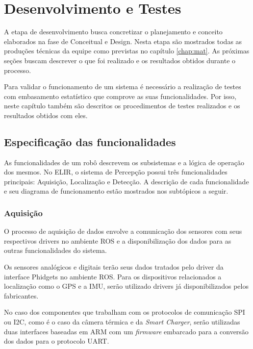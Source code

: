 \chapter{Desenvolvimento e Testes}
\label{chap:result}

A etapa de desenvolvimento busca concretizar o planejamento e conceito elaborados na fase de Conceitual e Design. Nesta etapa são mostrados todas as produções técnicas da equipe como  previstas no capítulo \ref{chap:mat}. As próximas seções buscam descrever o que foi realizado e os resultados obtidos durante o processo.

Para validar o funcionamento de um sistema é necessário a realização de testes com embasamento estatístico que comprove as suas funcionalidades. Por isso, neste capítulo também são descritos os procedimentos de testes realizados e os resultados obtidos com eles.

\section{Especificação das funcionalidades}
\label{sec:espf}


As funcionalidades de um robô descrevem os subsistemas e a lógica de operação dos mesmos. No ELIR, o sistema de Percepção possui três funcionalidades principais: Aquisição, Localização e Detecção. A descrição de cada funcionalidade e seu diagrama de funcionamento estão mostrados nos subtópicos a seguir. 

\subsection{Aquisição}
\label{ssec:func1}

O processo de aquisição de dados envolve a comunicação dos sensores com seus respectivos drivers no ambiente ROS e a disponibilização dos dados para as outras funcionalidades do sistema.

 Os sensores analógicos e digitais terão seus dados tratados pelo driver da interface Phidgets no ambiente ROS. Para os dispositivos relacionados a localização como o GPS e a IMU, serão utilizado drivers já disponibilizados pelos fabricantes.

No caso dos componentes que trabalham com os protocolos de comunicação SPI ou I2C, como é o caso da câmera térmica e da \textit{Smart Charger}, serão utilizadas duas interfaces baseadas em ARM com um \textit{firmware} embarcado para a conversão dos dados para o protocolo UART.

